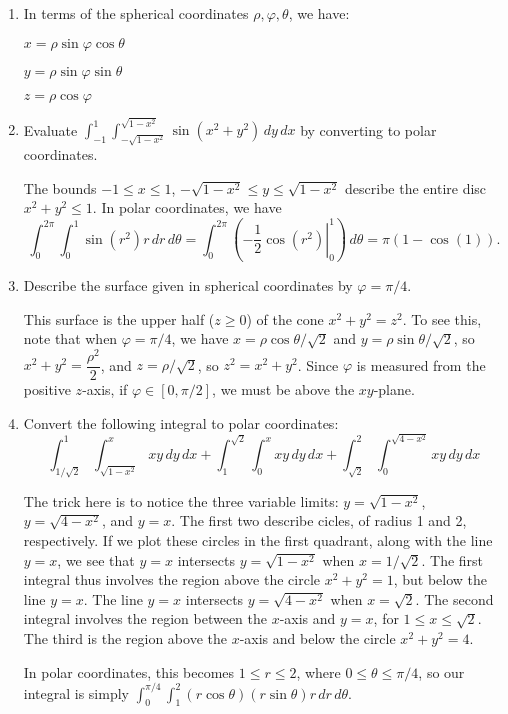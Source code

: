 \documentclass[12pt]{article}
\newcommand{\di}{\displaystyle}
\begin{document}
 \begin{enumerate}
 \item In terms of the spherical coordinates $\rho, \varphi, \theta$, we have:

\bigskip

$x=\rho\sin\varphi\cos\theta$

$y=\rho\sin\varphi\sin\theta$

$z=\rho\cos\varphi$


 \item Evaluate $\di \int_{-1}^1\int_{-\sqrt{1-x^2}}^{\sqrt{1-x^2}}\sin(x^2+y^2)\,dy\,dx$ by converting to polar coordinates.

\bigskip

The bounds $-1\leq x\leq 1$, $-\sqrt{1-x^2}\leq y\leq \sqrt{1-x^2}$ describe the entire disc $x^2+y^2\leq 1$. In polar coordinates, we have
\[
 \int_0^{2\pi}\int_0^1 \sin(r^2) r\,dr\,d\theta = \int_0^{2\pi}\left(\left. -\frac{1}{2}\cos(r^2)\right|_0^1\right)\,d\theta = \pi(1-\cos(1)).
\]

\item Describe the surface given in spherical coordinates by $\varphi = \pi/4$.

\bigskip

This surface is the upper half ($z\geq 0$) of the cone $x^2+y^2=z^2$. To see this, note that when $\varphi = \pi/4$, we have $x=\rho\cos\theta/\sqrt{2}$ and $y=\rho\sin\theta/\sqrt{2}$, so $x^2+y^2 = \dfrac{\rho^2}{2}$, and $z = \rho/\sqrt{2}$, so $z^2=x^2+y^2$. Since $\varphi$ is measured from the positive $z$-axis, if $\varphi\in [0,\pi/2]$, we must be above the $xy$-plane.

\item Convert the following integral to polar coordinates:
\[
 \int_{1/\sqrt{2}}^1\int_{\sqrt{1-x^2}}^x xy\,dy\,dx + \int_1^{\sqrt{2}}\int_0^x xy\,dy\,dx + \int_{\sqrt{2}}^2\int_0^{\sqrt{4-x^2}}xy\,dy\,dx
\]

\bigskip

The trick here is to notice the three variable limits: $y=\sqrt{1-x^2}$, $y=\sqrt{4-x^2}$, and $y=x$. The first two describe cicles, of radius 1 and 2, respectively. If we plot these circles in the first quadrant, along with the line $y=x$, we see that $y=x$ intersects $y=\sqrt{1-x^2}$ when $x=1/\sqrt{2}$. The first integral thus involves the region above the circle $x^2+y^2=1$, but below the line $y=x$. The line $y=x$ intersects $y=\sqrt{4-x^2}$ when $x=\sqrt{2}$. The second integral involves the region between the $x$-axis and $y=x$, for $1\leq x\leq \sqrt{2}$. The third is the region above the $x$-axis and below the circle $x^2+y^2=4$.

In polar coordinates, this becomes $1\leq r\leq 2$, where $0\leq \theta\leq \pi/4$, so our integral is simply $\int_0^{\pi/4}\int_1^2 (r\cos\theta)(r\sin\theta) r\,dr\,d\theta$. 
\end{enumerate}
\end{document}
